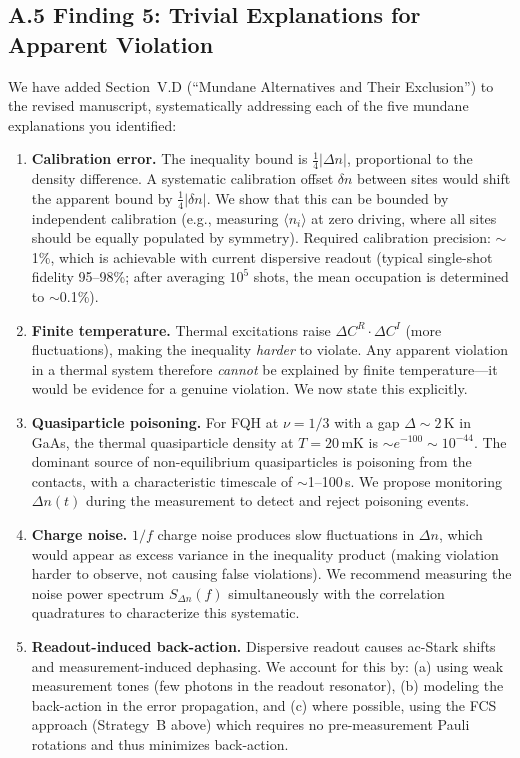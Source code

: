 \documentclass[11pt,a4paper]{article}
\begin{document}
\subsection*{A.5 Finding 5: Trivial Explanations for Apparent Violation}

We have added Section~V.D (``Mundane Alternatives and Their Exclusion'') to the revised manuscript, systematically addressing each of the five mundane explanations you identified:

\begin{enumerate}[leftmargin=*]
\item \textbf{Calibration error.} The inequality bound is $\frac{1}{4}|\Delta n|$, proportional to the density difference. A systematic calibration offset $\delta n$ between sites would shift the apparent bound by $\frac{1}{4}|\delta n|$. We show that this can be bounded by independent calibration (e.g., measuring $\langle n_i \rangle$ at zero driving, where all sites should be equally populated by symmetry). Required calibration precision: $\sim$1\%, which is achievable with current dispersive readout (typical single-shot fidelity 95--98\%; after averaging $10^5$ shots, the mean occupation is determined to $\sim$0.1\%).
\item \textbf{Finite temperature.} Thermal excitations raise $\Delta C^R \cdot \Delta C^I$ (more fluctuations), making the inequality \emph{harder} to violate. Any apparent violation in a thermal system therefore \emph{cannot} be explained by finite temperature---it would be evidence for a genuine violation. We now state this explicitly.
\item \textbf{Quasiparticle poisoning.} For FQH at $\nu = 1/3$ with a gap $\Delta \sim 2$\,K in GaAs, the thermal quasiparticle density at $T = 20$\,mK is $\sim e^{-100} \sim 10^{-44}$. The dominant source of non-equilibrium quasiparticles is poisoning from the contacts, with a characteristic timescale of $\sim$1--100\,s. We propose monitoring $\Delta n(t)$ during the measurement to detect and reject poisoning events.
\item \textbf{Charge noise.} $1/f$ charge noise produces slow fluctuations in $\Delta n$, which would appear as excess variance in the inequality product (making violation harder to observe, not causing false violations). We recommend measuring the noise power spectrum $S_{\Delta n}(f)$ simultaneously with the correlation quadratures to characterize this systematic.
\item \textbf{Readout-induced back-action.} Dispersive readout causes ac-Stark shifts and measurement-induced dephasing. We account for this by: (a) using weak measurement tones (few photons in the readout resonator), (b) modeling the back-action in the error propagation, and (c) where possible, using the FCS approach (Strategy~B above) which requires no pre-measurement Pauli rotations and thus minimizes back-action.
\end{enumerate}
\end{document}
